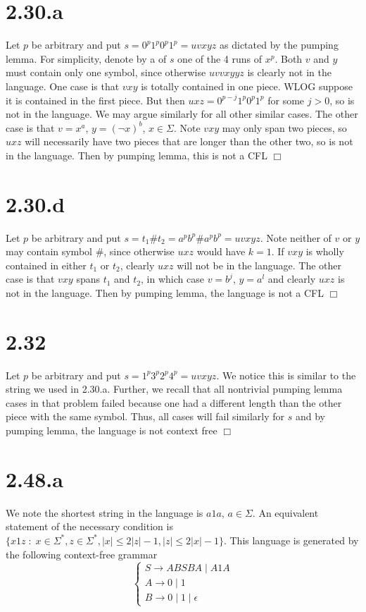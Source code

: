 \documentclass{article}
\begin{document}
\section*{2.30.a}
Let $p$ be arbitrary and put $s = 0^p1^p0^p1^p = uvxyz$ as dictated by the pumping lemma. For simplicity, denote by a  of $s$ one of the 4 runs of $x^p$. Both $v$ and $y$ must contain only one symbol, since otherwise $uvvxyyz$ is clearly not in the language. One case is that $vxy$ is totally contained in one piece. WLOG suppose it is contained in the first piece. But then $uxz = 0^{p-j}1^p0^p1^p$ for some $j > 0$, so is not in the language. We may argue similarly for all other similar cases. The other case is that $v = x^a$, $y = (\neg x)^b$, $x \in \Sigma$. Note $vxy$ may only span two pieces, so $uxz$ will necessarily have two pieces that are longer than the other two, so is not in the language. Then by pumping lemma, this is not a CFL $\Box$

\section*{2.30.d}
Let $p$ be arbitrary and put $s = t_1\#t_2 = a^pb^p\#a^pb^p = uvxyz$. Note neither of $v$ or $y$ may contain symbol $\#$, since otherwise $uxz$ would have $k = 1$. If $vxy$ is wholly contained in either $t_1$ or $t_2$, clearly $uxz$ will not be in the language. The other case is that $vxy$ spans $t_1$ and $t_2$, in which case $v = b^j$, $y = a^l$ and clearly $uxz$ is not in the language. Then by pumping lemma, the language is not a CFL $\Box$

\section*{2.32}
Let $p$ be arbitrary and put $s = 1^p3^p2^p4^p = uvxyz$. We notice this is similar to the string we used in 2.30.a. Further, we recall that all nontrivial pumping lemma cases in that problem failed because one  had a different length than the other piece with the same symbol. Thus, all cases will fail similarly for $s$ and by pumping lemma, the language is not context free $\Box$

\section*{2.48.a}
We note the shortest string in the language is $a1a$, $a \in \Sigma$. An equivalent statement of the necessary condition is $\{x1z \;:\; x \in \Sigma^*, z \in \Sigma^*, |x| \leq 2|z|-1, |z| \leq 2|x|-1\}$. This language is generated by the following context-free grammar
\begin{equation*}
\begin{cases}
S \to ABSBA \;|\; A1A\\
A \to 0 \;|\; 1\\
B \to 0 \;|\; 1 \;|\; \epsilon
\end{cases}
\end{equation*}
\end{document}
